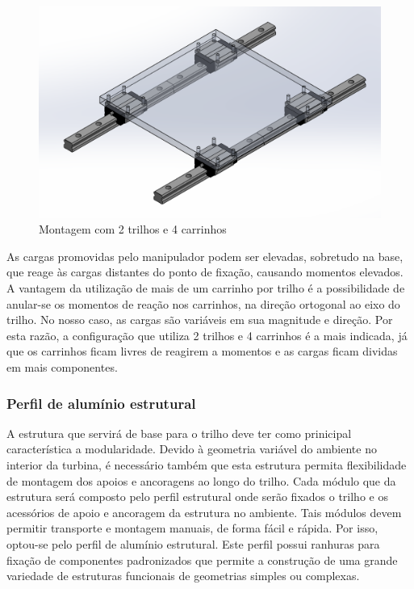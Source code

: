 \begin{figure}[H]
	\centering
	\includegraphics[width=0.9\columnwidth]{figs/construcao/sist_2por4}
	\caption{Montagem com 2 trilhos e 4 carrinhos}
    \label{fig::sist_2por4}
\end{figure}

As cargas promovidas pelo manipulador podem ser elevadas, sobretudo na base, que
reage às cargas distantes do ponto de fixação, causando momentos elevados. 
A vantagem da utilização de mais de um carrinho por trilho é a possibilidade de
anular-se os momentos de reação nos carrinhos, na direção ortogonal ao eixo do
trilho. 
No nosso caso, as cargas são variáveis em sua magnitude e direção.
Por esta razão, a configuração que utiliza 2 trilhos e 4 carrinhos é a mais
indicada, já que os carrinhos ficam livres de reagirem a momentos e as cargas ficam
dividas em mais componentes.


\subsubsection{Perfil de alumínio estrutural} \label{sec::perfil}

A estrutura que servirá de base para o trilho deve ter como prinicipal
característica a modularidade. Devido à geometria variável do ambiente no
interior da turbina, é necessário também que esta estrutura permita 
flexibilidade de montagem dos apoios e ancoragens ao longo do trilho.
Cada módulo que da estrutura será composto pelo perfil estrutural onde
serão fixados o trilho e os acessórios de apoio e ancoragem da estrutura no
ambiente.
Tais módulos devem permitir transporte e montagem manuais, de forma fácil e
rápida.
Por isso, optou-se pelo perfil de alumínio estrutural. Este perfil possui
ranhuras para fixação de componentes padronizados que permite a construção
de uma grande variedade de estruturas funcionais de geometrias simples ou
complexas.

